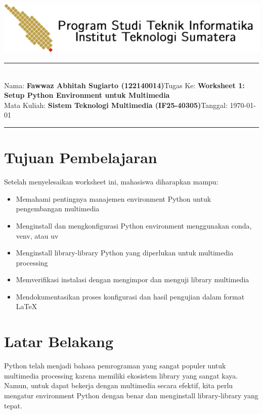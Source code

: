 \documentclass[11pt,a4paper]{article}
\newcommand{\student}{\textbf{Fawwaz Abhitah Sugiarto (122140014)}}
\newcommand{\course}{\textbf{Sistem Teknologi Multimedia (IF25-40305)}}
\newcommand{\assignment}{\textbf{Worksheet 1: Setup Python Environment untuk Multimedia}}
\begin{document}
\thispagestyle{empty}
\begin{center}
	\includegraphics[scale = 0.15]{Figure/ifitera-header.png}
	\vspace{0.1cm}
\end{center}
\noindent
\rule{17cm}{0.2cm}\\[0.3cm]
Nama: \student \hfill Tugas Ke: \assignment\\[0.1cm]
Mata Kuliah: \course \hfill Tanggal: \today\\
\rule{17cm}{0.05cm}
\vspace{0.1cm}



\section{Tujuan Pembelajaran}
Setelah menyelesaikan worksheet ini, mahasiswa diharapkan mampu:
\begin{itemize}
    \item Memahami pentingnya manajemen environment Python untuk pengembangan multimedia
    \item Menginstall dan mengkonfigurasi Python environment menggunakan conda, venv, atau uv
    \item Menginstall library-library Python yang diperlukan untuk multimedia processing
    \item Memverifikasi instalasi dengan mengimpor dan menguji library multimedia
    \item Mendokumentasikan proses konfigurasi dan hasil pengujian dalam format \LaTeX
\end{itemize}

\section{Latar Belakang}
Python telah menjadi bahasa pemrograman yang sangat populer untuk multimedia processing karena memiliki ekosistem library yang sangat kaya. Namun, untuk dapat bekerja dengan multimedia secara efektif, kita perlu mengatur environment Python dengan benar dan menginstall library-library yang tepat.
\end{document}
